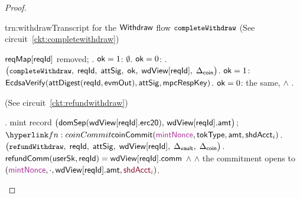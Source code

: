 \begin{proof}
\begin{itemize} [label=$\blacksquare$]
\begin{itemize}
\begin{TxtBox}{trn:withdraw}{Transcript for the $\mathsf{Withdraw}$ flow}
\vspace{5pt}
$\texttt{\small completeWithdraw}$ (See circuit~\ref{ckt:completewithdraw})
\begin{OutList}
\oitem{\Dvault} $\mathsf{reqMap}[\mathsf{reqId}]$ removed; .
\oitem{\Dshd} $\mathsf{ok} = 1$: $\emptyset$.   $\mathsf{ok} = 0$: .
\oitem{\stmt} $\bigl(\texttt{\small completeWithdraw},\; \mathsf{reqId},\; \mathsf{attSig},\; \mathsf{ok},\;
  \mathsf{wdView}[\mathsf{reqId}],\; \Delta_{\mathsf{coin}}\bigr)$.
\oitem{\Rel} $\mathsf{ok} = 1$: $\mathsf{EcdsaVerify}(\mathsf{attDigest}(\mathsf{reqId},\mathsf{evmOut}), \mathsf{attSig}, \mathsf{mpcRespKey})$. \quad
  $\mathsf{ok} = 0$: the same, $\wedge$ .
\end{OutList}

\vspace{10pt}

\upd{$\cktRefundWithdraw$} (See circuit~\ref{ckt:refundwithdraw})
\begin{OutList}
\oitem{\Dvault}  .
\oitem{\Dshd} \bluedot mint record $\bigl(\mathsf{domSep}(\mathsf{wdView}[\mathsf{reqId}].\mathsf{erc20}),\,
  \mathsf{wdView}[\mathsf{reqId}].\mathsf{amt}\bigr)$; \;
  \bluedot $\lnk{fn:coinCommit}{\coinCommit(\freshrn{\mintNonce},\tokType,\amt, \shdAcct_i)}$.
\oitem{\stmt} $\bigl(\texttt{\small refundWithdraw},\; \mathsf{reqId},\; \mathsf{attSig},\; \mathsf{wdView}[\mathsf{reqId}],\;
  \Delta_{\mathsf{vault}},\; \Delta_{\mathsf{coin}}\bigr)$.
\oitem{\Rel} $\mathsf{refundComm}(\mathsf{userSk}, \mathsf{reqId}) = \mathsf{wdView}[\mathsf{reqId}].\mathsf{comm}$ \;$\wedge$\;
   \;$\wedge$\; the commitment opens to
  $(\freshrn{\mintNonce}, \cdot, \upd{\wdView[\rid].\fAmt}, \secret{\shdAcct_i})$.
\end{OutList}
\end{TxtBox}


\end{itemize}
\end{itemize}
\end{proof}
